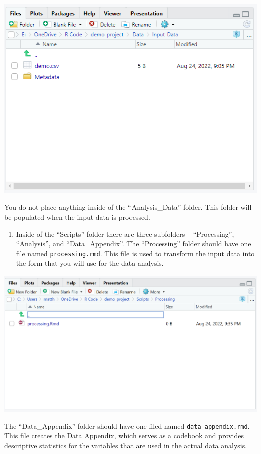 \documentclass[
]{book}
\providecommand{\tightlist}{%
  \setlength{\itemsep}{0pt}\setlength{\parskip}{0pt}}
\begin{document}
\includegraphics[width=7.86in]{images/tierinput}

You do not place anything inside of the ``Analysis\_Data'' folder. This folder will be populated when the input data is processed.

\begin{enumerate}
\def\labelenumi{\arabic{enumi}.}
\setcounter{enumi}{3}
\tightlist
\item
  Inside of the ``Scripts'' folder there are three subfolders -- ``Processing'', ``Analysis'', and ``Data\_Appendix''. The ``Processing'' folder should have one file named \texttt{processing.rmd}. This file is used to transform the input data into the form that you will use for the data analysis.
\end{enumerate}

\includegraphics[width=18.58in]{images/tierprocessing}

The ``Data\_Appendix'' folder should have one filed named \texttt{data-appendix.rmd}. This file creates the Data Appendix, which serves as a codebook and provides descriptive statistics for the variables that are used in the actual data analysis.
\end{document}
